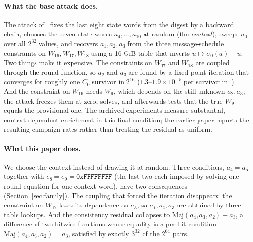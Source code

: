 \documentclass[11pt,a4paper]{article}
\newcommand{\sig}[1]{\sigma_{#1}}
\newcommand{\Maj}{\mathrm{Maj}}
\newcommand{\hex}[1]{\texttt{#1}}
\begin{document}
\paragraph{What the base attack does.}
The attack of~\cite{Basra2026R19} fixes the last eight state words from the
digest by a backward chain, chooses the seven state words $a_4,\dots,a_{10}$
at random (the \emph{context}), sweeps $a_0$ over all $2^{32}$ values, and
recovers $a_1,a_2,a_3$ from the three message-schedule constraints on
$W_{16},W_{17},W_{18}$ using a 16-GiB table that inverts $u\mapsto\sig0(u)-u$.
Two things make it expensive.  The constraints on $W_{17}$ and $W_{18}$ are
coupled through the round function, so $a_2$ and $a_3$ are found by a
fixed-point iteration that converges for roughly one $C_0$ survivor in
$2^{16}$ ($1.3$--$1.9\times10^{-5}$ per survivor in~\cite{Basra2026R19}).  And the constraint on $W_{16}$ needs $W_9$, which depends on the
still-unknown $a_2,a_3$; the attack freezes them at zero, solves, and
afterwards tests that the true $W_9$ equals the provisional one.  The archived
experiments measure substantial, context-dependent enrichment in this final
condition; the earlier paper reports the resulting campaign rates rather than
treating the residual as uniform.

\paragraph{What this paper does.}
We choose the context instead of drawing it at random.  Three conditions, $a_4=a_5$ together with $e_8=e_9=\hex{0xFFFFFFFF}$ (the
last two each imposed by solving one round equation for one context word),
have two consequences
(Section~\ref{sec:family}).  The coupling that forced the iteration
disappears: the constraint on $W_{17}$ loses its dependence on $a_3$, so
$a_1,a_2,a_3$ are obtained by three table lookups.  And the consistency
residual collapses to $\Maj(a_4,a_3,a_2)-a_3$, a difference of two bitwise
functions whose equality is a per-bit condition
$\Maj(a_4,a_3,a_2)=a_3$, satisfied by exactly $3^{32}$ of the $2^{64}$ pairs.
\end{document}
